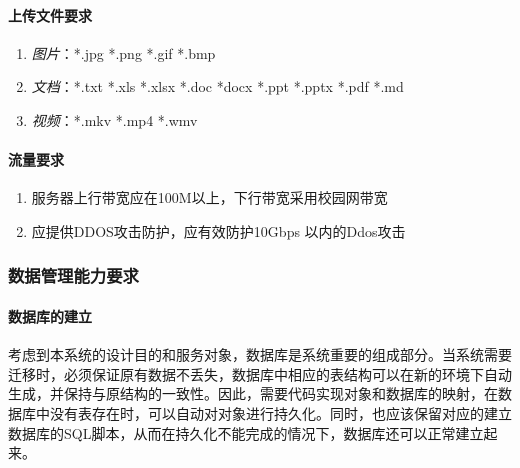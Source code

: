 \documentclass[UTF8]{ctexart}
\begin{document}
\paragraph{上传文件要求}
\begin{enumerate}[1)]
\item \emph{图片}：*.jpg  *.png  *.gif   *.bmp
\item \emph{文档}：*.txt   *.xls    *.xlsx  *.doc  *docx  *.ppt  *.pptx  *.pdf  *.md
\item \emph{视频}：*.mkv  *.mp4  *.wmv
\end{enumerate}

\paragraph{流量要求}
\begin{enumerate}[1)]
\item 服务器上行带宽应在100M以上，下行带宽采用校园网带宽
\item 应提供DDOS攻击防护，应有效防护10Gbps 以内的Ddos攻击
\end{enumerate}

\subsubsection{数据管理能力要求}
\paragraph{数据库的建立}
考虑到本系统的设计目的和服务对象，数据库是系统重要的组成部分。当系统需要迁移时，必须保证原有数据不丢失，数据库中相应的表结构可以在新的环境下自动生成，并保持与原结构的一致性。因此，需要代码实现对象和数据库的映射，在数据库中没有表存在时，可以自动对对象进行持久化。同时，也应该保留对应的建立数据库的SQL脚本，从而在持久化不能完成的情况下，数据库还可以正常建立起来。
\end{document}
